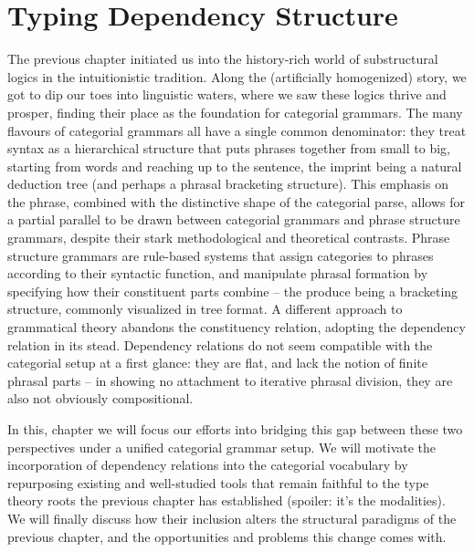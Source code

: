 \chapter{Typing Dependency Structure}
\label{chapter:chapter_2}


The previous chapter initiated us into the history-rich world of substructural logics in the intuitionistic tradition.
Along the (artificially homogenized) story, we got to dip our toes into linguistic waters, where we saw these logics thrive and prosper, finding their place as the foundation for categorial grammars.
The many flavours of categorial grammars all have a single common denominator: they treat syntax as a hierarchical structure that puts phrases together from small to big, starting from words and reaching up to the sentence, the imprint being a natural deduction tree (and perhaps a phrasal bracketing structure).
This emphasis on the phrase, combined with the distinctive shape of the categorial parse, allows for a partial parallel to be drawn between categorial grammars and phrase structure grammars, despite their stark methodological and theoretical contrasts.
Phrase structure grammars are rule-based systems that assign categories to phrases according to their syntactic function, and manipulate phrasal formation by specifying how their constituent parts combine -- the produce being a bracketing structure, commonly visualized in tree format.
A different approach to grammatical theory abandons the constituency relation, adopting the dependency relation in its stead.
Dependency relations do not seem compatible with the categorial setup at a first glance: they are flat, and lack the notion of finite phrasal parts -- in showing no attachment to iterative phrasal division, they are also not obviously compositional.

In this, chapter we will focus our efforts into bridging this gap between these two perspectives under a unified categorial grammar setup.
We will motivate the incorporation of dependency relations into the categorial vocabulary by repurposing existing and well-studied tools that remain faithful to the type theory roots the previous chapter has established (spoiler: it's the modalities).
We will finally discuss how their inclusion alters the structural paradigms of the previous chapter, and the opportunities and problems this change comes with.

